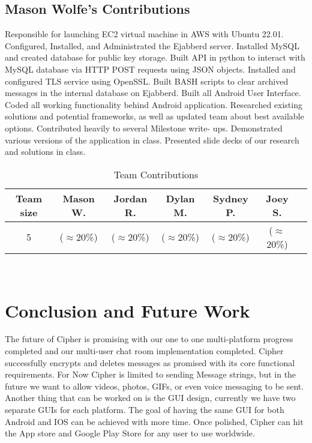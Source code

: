 \documentclass[12pt]{article}
\begin{document}
\subsection{Mason Wolfe's Contributions}
Responsible for launching EC2 virtual machine in AWS with Ubuntu 22.01. Configured, Installed, and Administrated the Ejabberd server. Installed MySQL and created database for public key storage. Built API in python to interact with MySQL database via HTTP POST requests using JSON objects. Installed and configured TLS service using OpenSSL. Built BASH scripts to clear archived messages in the internal database on Ejabberd. Built all Android User Interface. Coded all working functionality behind Android application. Researched existing solutions and potential frameworks, as well as updated team about best available options. Contributed heavily to several Milestone write- ups. Demonstrated various versions of the application in class. Presented slide decks of our research and solutions in class.  

\begin{table}[h]
\begin{center}
\caption{Team Contributions}\label{tab:effortsharing}
\begin{tabular}{|c|c|c|c|c|c|c|}
\hline
Team size & Mason W. & Jordan R. & Dylan M. & Sydney P. & Joey S.\\
\hline
5 & ($\approx$20\%) & ($\approx$20\%) & ($\approx$20\%) & ($\approx$20\%) & ($\approx$20\%)\\
\hline
\end{tabular}\\
\end{center}
\end{table}


\section{Conclusion and Future Work}\label{chap:conclusion}
The future of Cipher is promising with our one to one multi-platform progress completed and our multi-user chat room implementation completed. Cipher successfully encrypts and deletes messages as promised with its core functional requirements. For Now Cipher is limited to sending Message strings, but in the future we want to allow videos, photos, GIFs, or even voice messaging to be sent. Another thing that can be worked on is the GUI design, currently we have two separate GUIs for each platform. The goal of having the same GUI for both Android and IOS can be achieved with more time. Once polished, Cipher can hit the App store and Google Play Store for any user to use worldwide.
\end{document}
